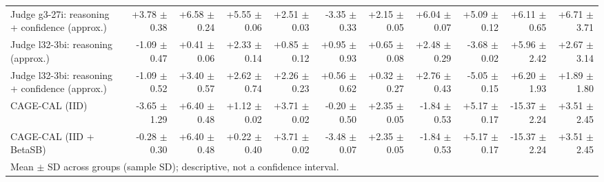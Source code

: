 \begin{tabular}{lrrrrrrrrrr}
Judge g3-27i: reasoning + confidence (approx.) & +3.78 {\scriptsize $\pm$ 0.38} & +6.58 {\scriptsize $\pm$ 0.24} & +5.55 {\scriptsize $\pm$ 0.06} & +2.51 {\scriptsize $\pm$ 0.03} & -3.35 {\scriptsize $\pm$ 0.33} & +2.15 {\scriptsize $\pm$ 0.05} & +6.04 {\scriptsize $\pm$ 0.07} & +5.09 {\scriptsize $\pm$ 0.12} & +6.11 {\scriptsize $\pm$ 0.65} & +6.71 {\scriptsize $\pm$ 3.71} \\
Judge l32-3bi: reasoning (approx.) & -1.09 {\scriptsize $\pm$ 0.47} & +0.41 {\scriptsize $\pm$ 0.06} & +2.33 {\scriptsize $\pm$ 0.14} & +0.85 {\scriptsize $\pm$ 0.12} & +0.95 {\scriptsize $\pm$ 0.93} & +0.65 {\scriptsize $\pm$ 0.08} & +2.48 {\scriptsize $\pm$ 0.29} & -3.68 {\scriptsize $\pm$ 0.02} & +5.96 {\scriptsize $\pm$ 2.42} & +2.67 {\scriptsize $\pm$ 3.14} \\
Judge l32-3bi: reasoning + confidence (approx.) & -1.09 {\scriptsize $\pm$ 0.52} & +3.40 {\scriptsize $\pm$ 0.57} & +2.62 {\scriptsize $\pm$ 0.74} & +2.26 {\scriptsize $\pm$ 0.23} & +0.56 {\scriptsize $\pm$ 0.62} & +0.32 {\scriptsize $\pm$ 0.27} & +2.76 {\scriptsize $\pm$ 0.43} & -5.05 {\scriptsize $\pm$ 0.15} & +6.20 {\scriptsize $\pm$ 1.93} & +1.89 {\scriptsize $\pm$ 1.80} \\
CAGE-CAL (IID) & -3.65 {\scriptsize $\pm$ 1.29} & +6.40 {\scriptsize $\pm$ 0.48} & +1.12 {\scriptsize $\pm$ 0.02} & +3.71 {\scriptsize $\pm$ 0.02} & -0.20 {\scriptsize $\pm$ 0.50} & +2.35 {\scriptsize $\pm$ 0.05} & -1.84 {\scriptsize $\pm$ 0.53} & +5.17 {\scriptsize $\pm$ 0.17} & -15.37 {\scriptsize $\pm$ 2.24} & +3.51 {\scriptsize $\pm$ 2.45} \\
CAGE-CAL (IID + BetaSB) & -0.28 {\scriptsize $\pm$ 0.30} & +6.40 {\scriptsize $\pm$ 0.48} & +0.22 {\scriptsize $\pm$ 0.40} & +3.71 {\scriptsize $\pm$ 0.02} & -3.48 {\scriptsize $\pm$ 0.07} & +2.35 {\scriptsize $\pm$ 0.05} & -1.84 {\scriptsize $\pm$ 0.53} & +5.17 {\scriptsize $\pm$ 0.17} & -15.37 {\scriptsize $\pm$ 2.24} & +3.51 {\scriptsize $\pm$ 2.45} \\
\bottomrule
\multicolumn{11}{l}{\scriptsize Mean $\pm$ SD across groups (sample SD); descriptive, not a confidence interval.} \\
\end{tabular}
